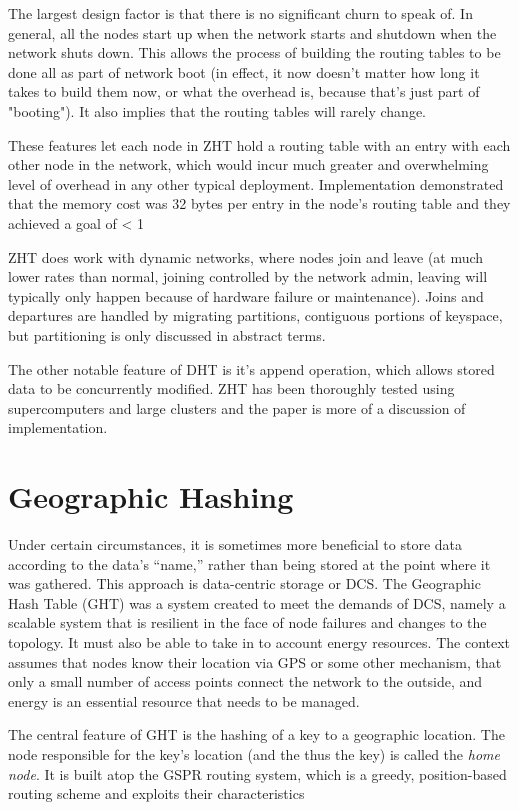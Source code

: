 \documentclass[10pt,letterpaper]{report}
\begin{document}
The largest design factor is that there is no significant churn to speak of.  In general, all the nodes start up when the network starts and shutdown when the network shuts down.  This  allows the process of building the routing tables to be done all as part of network boot (in effect, it now doesn't matter how long it takes to build them now, or what the overhead is, because that's just part of "booting").  It also implies that the routing tables will rarely change.  

These features let each node in ZHT hold a routing table with an entry with each other node in the network, which would incur much greater and overwhelming level of overhead in any  other typical deployment.  Implementation demonstrated that the memory cost was 32 bytes per entry in the node's routing table and they achieved a goal of < 1%

ZHT does work with dynamic networks, where nodes join and leave (at much lower rates than normal,  joining controlled by the network admin, leaving will typically only happen because of hardware failure or maintenance).  Joins and departures  are handled by migrating partitions, contiguous portions of keyspace, but partitioning is only discussed in abstract terms.

The other notable feature of DHT is it's append operation, which allows stored data  to be concurrently modified.  ZHT has been thoroughly tested using  supercomputers and large clusters and the paper is more of a discussion of implementation. 



\section{Geographic Hashing}
Under certain circumstances, it is sometimes more beneficial to store data according to the data's ``name,'' rather than being stored at the point where it was gathered.
This approach is data-centric storage or DCS.
The Geographic Hash Table (GHT) 
\cite{ratnasamy2002ght} was a system created to meet the demands of DCS, namely a scalable system that is resilient in the face of node failures and changes to the topology.  
It must also be able to take in to account energy resources.
The context assumes that nodes know their location via GPS or some other mechanism, that only a small number of access points connect the network to the outside, and energy is an essential resource that needs to be managed.


The central feature of GHT is the hashing of a key to a geographic location.  
The node responsible for the key's location (and the thus the key) is called the \textit{home node}.  
It is built atop the GSPR \cite{karp2000gpsr} routing system, which is a greedy, position-based routing scheme and exploits their characteristics
\end{document}

